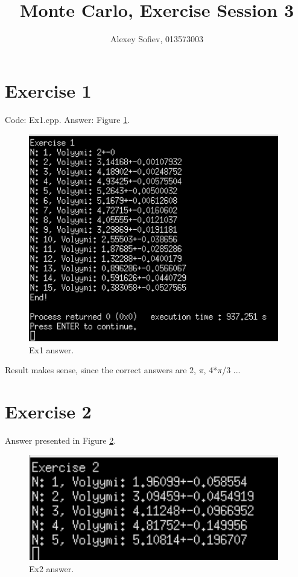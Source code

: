 \documentclass{article}
\begin{document}
\title{Monte Carlo, Exercise Session 3}
\author{Alexey Sofiev, 013573003}

\maketitle


\section{Exercise 1}
Code: Ex1.cpp. Answer: Figure \ref{fig:ex1_answer}.

\begin{figure}[!hbt]
    \centering
    \includegraphics[width=4.3in]{ex1_answer}
    \caption{Ex1 answer.}
    \label{fig:ex1_answer}
\end{figure}

	Result makes sense, since the correct answers are 2, $\pi$, 4*$\pi$/3 ...


\section{Exercise 2}
Answer presented in Figure \ref{fig:ex2_answer}.
\begin{figure}[!hbt]
	\centering
	\includegraphics[width=4.3in]{ex2_answer}
	\caption{Ex2 answer.}
	\label{fig:ex2_answer}
\end{figure}
\end{document}
